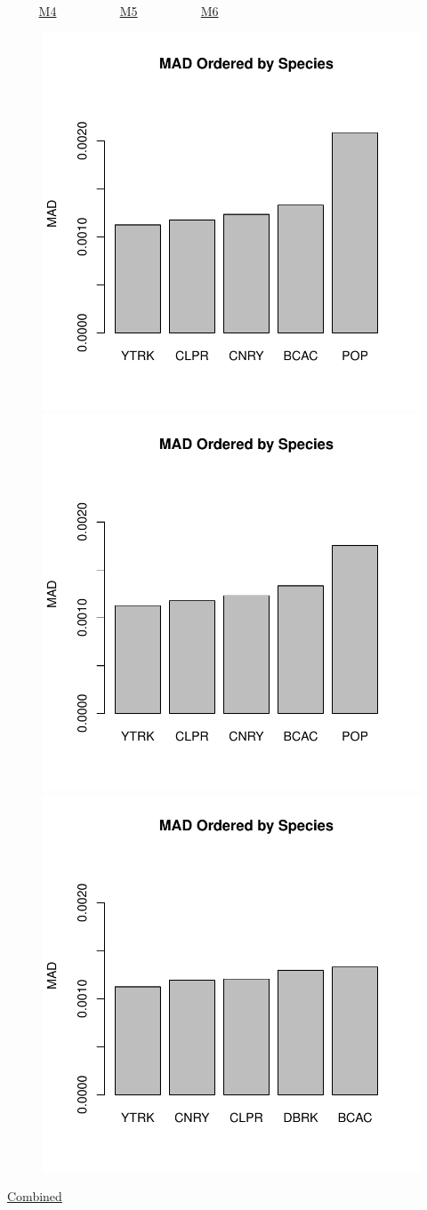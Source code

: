 \documentclass[ xcolor = pdftex, dvipsnames, table ]{beamer}
\begin{document}
\begin{frame}{$~~~~~~~~~~$ \href{https://github.com/gasduster99/sppComp/tree/master/sscRuns/26919781982M4}{M4} $~~~~~~~~~~~~~~~~~~~~$ \href{https://github.com/gasduster99/sppComp/tree/master/sscRuns/26919781982M5}{M5} $~~~~~~~~~~~~~~~~~~~~$ \href{https://github.com/gasduster99/sppComp/tree/master/sscRuns/26919781982M6}{M6} }	
	\begin{figure}[ht!]
        \centering
	\hspace*{-1cm}
        \includegraphics[width=.4\textwidth]{../sscRuns/26919781982M4/sppHeadMad68.pdf}
        \includegraphics[width=.4\textwidth]{../sscRuns/26919781982M5/sppHeadMad68.pdf}
	\includegraphics[width=.4\textwidth]{../sscRuns/26919781982M6/sppHeadMad68.pdf}
	\end{figure}
	\vspace{-1cm}
	\begin{center}
	\Large
	\href{https://github.com/gasduster99/sppComp/tree/master/try1/postSSC/26919781982M4M5M6}{Combined}
	\end{center}
\end{frame}
\end{document}
